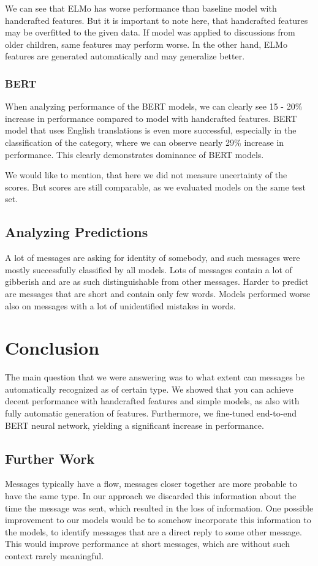 \documentclass[11pt,a4paper]{article}
\begin{document}
We can see that ELMo has worse performance than baseline model with handcrafted features. But it is important to note here, that handcrafted features may be overfitted to the given data. If model was applied to discussions from older children, same features may perform worse. In the other hand, ELMo features are generated automatically and may generalize better.

\subsubsection{BERT}
When analyzing performance of the BERT models, we can clearly see 15 - 20\% increase in performance compared to model with handcrafted features. BERT model that uses English translations is even more successful, especially in the classification of the category, where we can observe nearly 29\% increase in performance. This clearly demonstrates dominance of BERT models.

We would like to mention, that here we did not measure uncertainty of the scores. But scores are still comparable, as we evaluated models on the same test set.
 
\subsection{Analyzing Predictions}
A lot of messages are asking for identity of somebody, and such messages were mostly successfully classified by all models. Lots of messages contain a lot of gibberish and are as such distinguishable from other messages. Harder to predict are messages that are short and contain only few words. Models performed worse also on messages with a lot of unidentified mistakes in words. 

\section{Conclusion}
The main question that we were answering was to what extent can messages be automatically recognized as of certain type. We showed that you can achieve decent performance with handcrafted features and simple models, as also with fully automatic generation of features. Furthermore, we fine-tuned end-to-end BERT neural network, yielding a significant increase in performance.

\subsection{Further Work}
Messages typically have a flow, messages closer together are more probable to have the same type. In our approach we discarded this information about the time the message was sent, which resulted in the loss of information. One possible improvement to our models would be to somehow incorporate this information to the models, to identify messages that are a direct reply to some other message. This would improve performance at short messages, which are without such context rarely meaningful.

 



\end{document}
